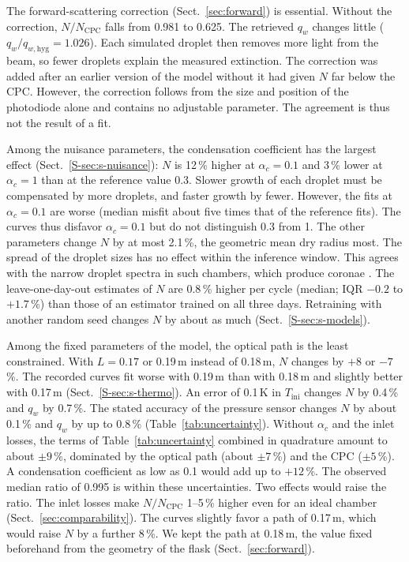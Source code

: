 \documentclass[preprint,review,12pt,authoryear]{elsarticle}
\begin{document}
The forward-scattering correction (Sect.~\ref{sec:forward}) is essential. Without the correction,
$N/N_\mathrm{CPC}$ falls from 0.981 to 0.625. The retrieved $q_w$ changes little
($q_w/q_{w,\mathrm{hyg}} = 1.026$).
Each simulated droplet then removes more light from the beam, so fewer droplets explain the measured
extinction.
The correction was added after an earlier version of the model without it had given $N$ far below
the CPC. However, the correction follows from the size and position of the photodiode alone and
contains no adjustable parameter. The agreement is thus not the result of a fit.

Among the nuisance parameters, the condensation coefficient has the largest effect
(Sect.~\ref{S-sec:s-nuisance}): $N$ is 12\,\% higher at $\alpha_c = 0.1$ and 3\,\% lower at
$\alpha_c = 1$ than at the reference value 0.3. Slower growth of each droplet must be compensated by
more droplets, and faster growth by fewer.
However, the fits at $\alpha_c = 0.1$ are worse (median misfit about five times that of the reference fits).
The curves thus disfavor $\alpha_c = 0.1$ but do not distinguish 0.3 from 1.
The other parameters change $N$ by at most 2.1\,\%, the geometric mean dry radius most. The spread of the
droplet sizes has no effect within the inference window. This agrees with the narrow droplet spectra in such
chambers, which produce coronae
\citep{aoki2013corona,moteki2013new}. The leave-one-day-out estimates of $N$ are 0.8\,\% higher per cycle
(median; IQR $-0.2$ to $+1.7$\,\%) than those of an estimator trained on all three days. Retraining with
another random seed changes $N$ by about as much (Sect.~\ref{S-sec:s-models}).

Among the fixed parameters of the model, the optical path is the least constrained.
With $L = 0.17$ or 0.19\,m instead of 0.18\,m, $N$ changes by $+8$ or $-7$\,\%.
The recorded curves fit worse with 0.19\,m than with 0.18\,m and slightly better with 0.17\,m
(Sect.~\ref{S-sec:s-thermo}).
An error of 0.1\,K in $T_\mathrm{ini}$ changes $N$ by 0.4\,\% and $q_w$ by 0.7\,\%. The stated accuracy
of the pressure sensor changes $N$ by about 0.1\,\% and $q_w$ by up to 0.8\,\%
(Table~\ref{tab:uncertainty}).
Without $\alpha_c$ and the inlet losses, the terms of Table~\ref{tab:uncertainty} combined in quadrature
amount to about $\pm9$\,\%, dominated
by the optical path (about $\pm7$\,\%) and the CPC ($\pm5$\,\%). A condensation coefficient as low
as 0.1 would add up to $+12$\,\%.
The observed median ratio of 0.995 is within these uncertainties.
Two effects would raise the ratio. The inlet losses make $N/N_\mathrm{CPC}$ 1--5\,\% higher even for an
ideal chamber (Sect.~\ref{sec:comparability}). The curves slightly favor a path of 0.17\,m, which would
raise $N$ by a further 8\,\%. We kept the path at 0.18\,m, the value fixed beforehand from the geometry of
the flask (Sect.~\ref{sec:forward}).
\end{document}
